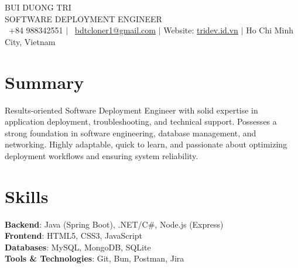\documentclass[a4paper,11pt]{article}
\begin{document}
\begin{center}
    {\Huge \scshape BUI DUONG TRI} \\ \vspace{5pt}
    {\large SOFTWARE DEPLOYMENT ENGINEER} \\ \vspace{5pt}
    \small \Mobilefone\ +84 988342551 $|$ \Letter\ \href{mailto:bdtcloner1@gmail.com}{bdtcloner1@gmail.com} $|$ Website: \href{https://tridev.id.vn}{tridev.id.vn} $|$ Ho Chi Minh City, Vietnam
\end{center}

\section{Summary}
\small
Results-oriented Software Deployment Engineer with solid expertise in application deployment, troubleshooting, and technical support. Possesses a strong foundation in software engineering, database management, and networking. Highly adaptable, quick to learn, and passionate about optimizing deployment workflows and ensuring system reliability.

\section{Skills}
\begin{itemize}[leftmargin=0.15in, label={}]
    \small{\item{
     \textbf{Backend}{: Java (Spring Boot), .NET/C\#, Node.js (Express)} \\
     \textbf{Frontend}{: HTML5, CSS3, JavaScript} \\
     \textbf{Databases}{: MySQL, MongoDB, SQLite} \\
     \textbf{Tools \& Technologies}{: Git, Bun, Postman, Jira}
    }}
\end{itemize}

\end{document}

